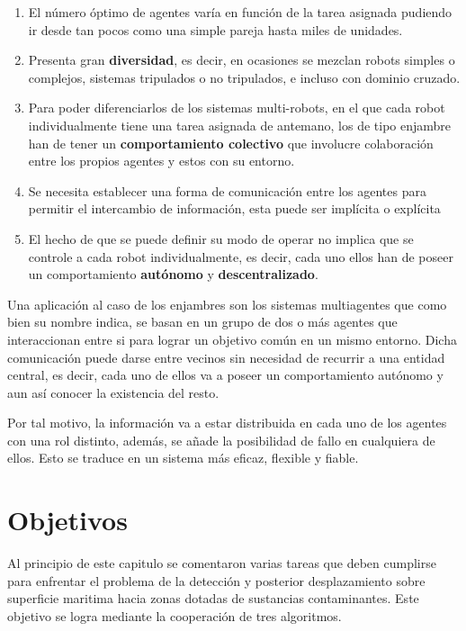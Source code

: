 \begin{enumerate}
	\item El número óptimo de agentes varía en función de la tarea asignada pudiendo ir desde tan pocos como una simple pareja hasta miles de unidades.
	\item Presenta gran \textbf{diversidad}, es decir, en ocasiones se mezclan robots simples o complejos, sistemas tripulados o no tripulados, e incluso con dominio cruzado.
	\item Para poder diferenciarlos de los sistemas multi-robots, en el que cada robot individualmente tiene una tarea asignada de antemano, los de tipo enjambre han de tener un \textbf{comportamiento colectivo} que involucre colaboración entre los propios agentes y estos con su entorno.
	\item Se necesita establecer una forma de comunicación entre los agentes para permitir el intercambio de información, esta puede ser implícita o explícita
	\item El hecho de que se puede definir su modo de operar no implica que se controle a cada robot individualmente, es decir, cada uno ellos han de poseer un comportamiento \textbf{autónomo} y \textbf{descentralizado}.
\end{enumerate}

Una aplicación al caso de los enjambres son los sistemas multiagentes que como bien su nombre indica, se basan en un grupo de dos o más agentes que interaccionan entre si para lograr un objetivo común en un mismo entorno. Dicha comunicación puede darse entre vecinos sin necesidad de recurrir a una entidad central, es decir, cada uno de ellos va a poseer un comportamiento autónomo y aun así conocer la existencia del resto.

Por tal motivo, la información va a estar distribuida en cada uno de los agentes con una rol distinto, además, se añade la posibilidad de fallo en cualquiera de ellos. Esto se traduce en un sistema más eficaz, flexible y fiable. 

\section{Objetivos}

Al principio de este capitulo se comentaron varias tareas que deben cumplirse para enfrentar el problema de la detección y posterior desplazamiento sobre superficie maritima hacia zonas dotadas de sustancias contaminantes. Este objetivo se logra mediante la cooperación de tres algoritmos.

